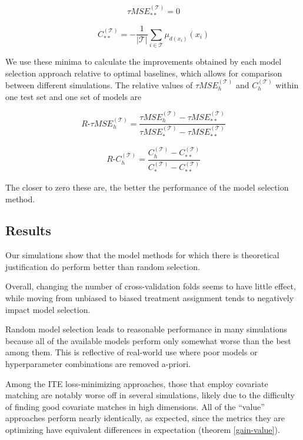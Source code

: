 \[
\tau MSE^{(\mathcal{T})}_{**} = 0
\]

\[
C^{(\mathcal{T})}_{**} = -\frac{1}{|\mathcal{T}|}\sum_{i \in \mathcal{T}} \mu_{ d(x_i)}(x_i)
\]

We use these minima to calculate the improvements obtained by each model selection approach relative to optimal baselines, which allows for comparison between different simulations. The relative values of $\tau MSE^{(\mathcal{T})}_{h}$ and $C^{(\mathcal{T})}_{h}$ within one test set and one set of models are

\[
	R\text{-} \tau MSE^{(\mathcal{T})}_{h} = 
	\frac{\tau MSE^{(\mathcal{T})}_{h} - \tau MSE^{(\mathcal{T})}_{**}}{\tau MSE^{(\mathcal{T})}_{*} - \tau MSE^{(\mathcal{T})}_{**}}
\]

\[
	R\text{-}  C^{(\mathcal{T})}_{h} = 
	\frac{ C^{(\mathcal{T})}_{h} -  C^{(\mathcal{T})}_{**}}{ C^{(\mathcal{T})}_{*} -  C^{(\mathcal{T})}_{**}}
\]

The closer to zero these are, the better the performance of the model selection method.

\subsection{Results}

Our simulations show that the model methods for which there is theoretical justification do perform better than random selection. 

Overall, changing the number of cross-validation folds seems to have little effect, while moving from unbiased to biased treatment assignment tends to negatively impact model selection. 

Random model selection leads to reasonable performance in many simulations because all of the available models perform only somewhat worse than the best among them. This is reflective of real-world use where poor models or hyperparameter combinations are removed a-priori. 

Among the ITE loss-minimizing approaches, those that employ covariate matching are notably worse off in several simulations, likely due to the difficulty of finding good covariate matches in high dimensions. All of the ``value'' approaches perform nearly identically, as expected, since the metrics they are optimizing have equivalent differences in expectation (theorem \ref{gain-value}). 


